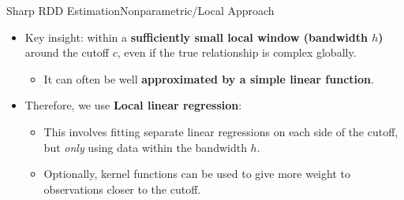 \documentclass[dvipsnames,hyperref={pdfpagelabels=false}]{beamer}
\begin{document}
\begin{frame}{Sharp RDD Estimation}{Nonparametric/Local Approach}
\begin{itemize}
	\item Key insight: within a \textbf{sufficiently small local window (bandwidth $h$)} around the cutoff $c$, even if the true relationship is complex globally.
	\begin{itemize}
		\vspace{0.2cm}
	\item It can often be well \textbf{approximated by a simple linear function}.
	\vspace{0.2cm}
\end{itemize}
	\item Therefore, we use \textbf{Local linear regression}:
			\vspace{0.2cm}
	\begin{itemize}
		\item This involves fitting separate linear regressions on each side of the cutoff, but \textit{only} using data within the bandwidth $h$.
		\vspace{0.2cm}
		\item Optionally, kernel functions can be used to give more weight to observations closer to the cutoff.
	\end{itemize}
\end{itemize}
\end{frame}
\end{document}
